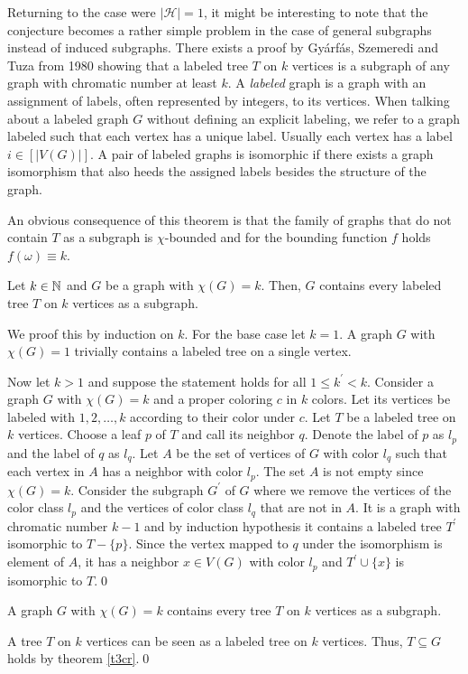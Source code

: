 Returning to the case were $\vert\mathcal{H}\vert =1$, it might be interesting to note that the conjecture becomes a rather simple problem in the case of general subgraphs instead of induced subgraphs. There exists a proof by Gyárfás, Szemeredi and Tuza from 1980 \cite{GST80} showing that a labeled tree $T$ on $k$ vertices is a subgraph of any graph with chromatic number at least $k$. A \textit{labeled} graph is a graph with an assignment of labels, often represented by integers, to its vertices. When talking about a labeled graph $G$ without defining an explicit labeling, we refer to a graph labeled such that each vertex has a unique label. Usually each vertex has a label $i\in [\vert V(G)\vert ]$. A pair of labeled graphs is isomorphic if there exists a graph isomorphism that also heeds the assigned labels besides the structure of the graph.

An obvious consequence of this theorem is that the family of graphs that do not contain $T$ as a subgraph is $\chi$-bounded and for the bounding function $f$ holds $f(\omega )\equiv k$.

\begin{thm}\label{t3cr}
Let $k\in\mathbb{N}$ and $G$ be a graph with $\chi (G) = k$. Then, $G$ contains every labeled tree $T$ on $k$ vertices as a subgraph. 
\end{thm}
\begin{prf}
We proof this by induction on $k$. For the base case let $k=1$. A graph $G$ with $\chi (G)=1$ trivially contains a labeled tree on a single vertex.

Now let $k>1$ and suppose the statement holds for all $1\leq k^\prime <k$. Consider a graph $G$ with $\chi (G) = k$ and a proper coloring $c$ in $k$ colors. Let its vertices be labeled with $1, 2, \dots , k$ according to their color under $c$. Let $T$ be a labeled tree on $k$ vertices. Choose a leaf $p$ of $T$ and call its neighbor $q$. Denote the label of $p$ as $l_p$ and the label of $q$ as $l_q$. Let $A$ be the set of vertices of $G$ with color $l_q$ such that each vertex in $A$ has a neighbor with color $l_p$. The set $A$ is not empty since $\chi (G)=k$. Consider the subgraph $G^\prime$ of $G$ where we remove the vertices of the color class $l_p$ and the vertices of color class $l_q$ that are not in $A$. It is a graph with chromatic number $k-1$ and by induction hypothesis it contains a labeled tree $T^\prime$ isomorphic to $T-\lbrace p\rbrace$. Since the vertex mapped to $q$ under the isomorphism is element of $A$, it has a neighbor $x\in V(G)$ with color $l_p$ and $T^\prime\cup\lbrace x\rbrace$ is isomorphic to $T$.\qed
\end{prf}
\begin{cor}
A graph $G$ with $\chi (G) = k$ contains every tree $T$ on $k$ vertices as a subgraph. 
\end{cor}
\begin{prf}
A tree $T$ on $k$ vertices can be seen as a labeled tree on $k$ vertices. Thus, $T\subseteq G$ holds by theorem \ref{t3cr}.\qed
\end{prf}

